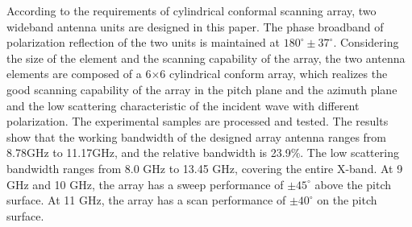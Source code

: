\documentclass[USenglish]{article}
\theoremstyle{dgthm}
\theoremstyle{dgdef}
\begin{document}
According to the requirements of cylindrical conformal scanning array, two wideband antenna units are designed in this paper. The phase broadband of polarization reflection of the two units is maintained at $180^\circ\pm37^\circ$. Considering the size of the element and the scanning capability of the array, the two antenna elements are composed of a 6$\times$6 cylindrical conform array, which realizes the good scanning capability of the array in the pitch plane and the azimuth plane and the low scattering characteristic of the incident wave with different polarization. The experimental samples are processed and tested. The results show that the working bandwidth of the designed array antenna ranges from 8.78GHz to 11.17GHz, and the relative bandwidth is 23.9\%. The low scattering bandwidth ranges from 8.0 GHz to 13.45 GHz, covering the entire X-band. At 9 GHz and 10 GHz, the array has a sweep performance of $\pm45^\circ$ above the pitch surface. At 11 GHz, the array has a scan performance of $\pm40^\circ$ on the pitch surface.
\end{document}
